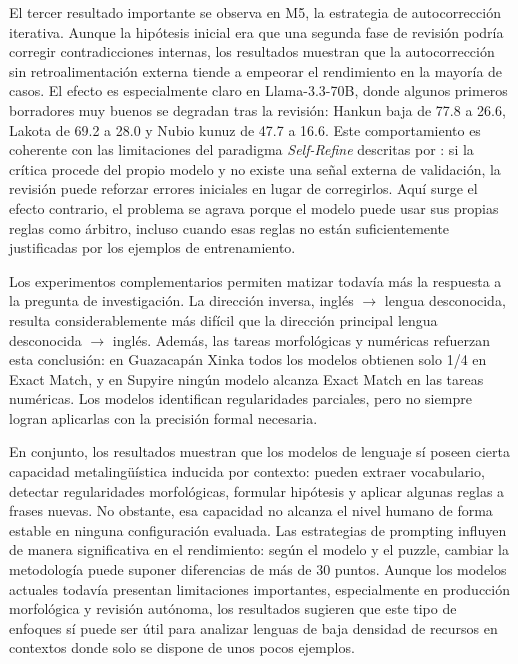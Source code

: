 El tercer resultado importante se observa en M5, la estrategia de autocorrección iterativa. Aunque la hipótesis inicial era que una segunda fase de revisión podría corregir contradicciones internas, los resultados muestran que la autocorrección sin retroalimentación externa tiende a empeorar el rendimiento en la mayoría de casos. El efecto es especialmente claro en Llama-3.3-70B, donde algunos primeros borradores muy buenos se degradan tras la revisión: Hankun baja de 77.8 a 26.6, Lakota de 69.2 a 28.0 y Nubio kunuz de 47.7 a 16.6. Este comportamiento es coherente con las limitaciones del paradigma \textit{Self-Refine} descritas por \citet{madaan2023selfrefine}: si la crítica procede del propio modelo y no existe una señal externa de validación, la revisión puede reforzar errores iniciales en lugar de corregirlos. Aquí surge el efecto contrario, el problema se agrava porque el modelo puede usar sus propias reglas como árbitro, incluso cuando esas reglas no están suficientemente justificadas por los ejemplos de entrenamiento.

Los experimentos complementarios permiten matizar todavía más la respuesta a la pregunta de investigación. La dirección inversa, inglés $\rightarrow$ lengua desconocida, resulta considerablemente más difícil que la dirección principal lengua desconocida $\rightarrow$ inglés. Además, las tareas morfológicas y numéricas refuerzan esta conclusión: en Guazacapán Xinka todos los modelos obtienen solo 1/4 en Exact Match, y en Supyire ningún modelo alcanza Exact Match en las tareas numéricas. Los modelos identifican regularidades parciales, pero no siempre logran aplicarlas con la precisión formal necesaria.

En conjunto, los resultados muestran que los modelos de lenguaje sí poseen cierta capacidad metalingüística inducida por contexto: pueden extraer vocabulario, detectar regularidades morfológicas, formular hipótesis y aplicar algunas reglas a frases nuevas. No obstante, esa capacidad no alcanza el nivel humano de forma estable en ninguna configuración evaluada. Las estrategias de prompting influyen de manera significativa en el rendimiento: según el modelo y el puzzle, cambiar la metodología puede suponer diferencias de más de 30 puntos. 
Aunque los modelos actuales todavía presentan limitaciones importantes, especialmente en producción morfológica y revisión autónoma, los resultados sugieren que este tipo de enfoques sí puede ser útil para analizar lenguas de baja densidad de recursos en contextos donde solo se dispone de unos pocos ejemplos.